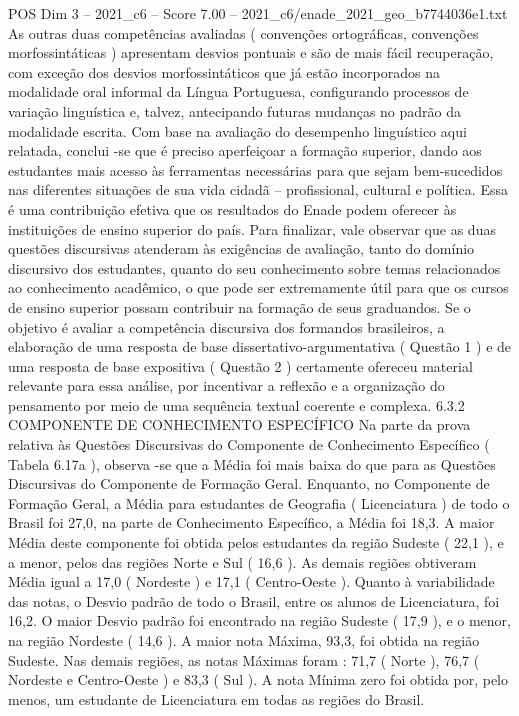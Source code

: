 \begin{textsample}{POS Dim 3 – 2021\_c6 – Score 7.00 – 2021\_c6/enade\_2021\_geo\_b7744036e1.txt}
As outras duas competências avaliadas ( convenções ortográficas, convenções morfossintáticas ) apresentam desvios pontuais e são de mais fácil recuperação, com exceção dos desvios morfossintáticos que já estão incorporados na modalidade oral informal da Língua Portuguesa, configurando processos de variação linguística e, talvez, antecipando futuras mudanças no padrão da modalidade escrita.
Com base na avaliação do desempenho linguístico aqui relatada, conclui -se que é preciso aperfeiçoar a formação superior, dando aos estudantes mais acesso às ferramentas necessárias para que sejam bem-sucedidos nas diferentes situações de sua vida cidadã – profissional, cultural e política.
Essa é uma contribuição efetiva que os resultados do Enade podem oferecer às instituições de ensino superior do país.
Para finalizar, vale observar que as duas questões discursivas atenderam às exigências de avaliação, tanto do domínio discursivo dos estudantes, quanto do seu conhecimento sobre temas relacionados ao conhecimento acadêmico, o que pode ser extremamente útil para que os cursos de ensino superior possam contribuir na formação de seus graduandos.
Se o objetivo é avaliar a competência discursiva dos formandos brasileiros, a elaboração de uma resposta de base dissertativo-argumentativa ( Questão 1 ) e de uma resposta de base expositiva ( Questão 2 ) certamente ofereceu material relevante para essa análise, por incentivar a reflexão e a organização do pensamento por meio de uma sequência textual coerente e complexa. 6.3.2 COMPONENTE DE CONHECIMENTO ESPECÍFICO Na parte da prova relativa às Questões Discursivas do Componente de Conhecimento Específico ( Tabela 6.17a ), observa -se que a Média foi mais baixa do que para as Questões Discursivas do Componente de Formação Geral.
Enquanto, no Componente de Formação Geral, a Média para estudantes de Geografia ( Licenciatura ) de todo o Brasil foi 27,0, na parte de Conhecimento Específico, a Média foi 18,3.
A maior Média deste componente foi obtida pelos estudantes da região Sudeste ( 22,1 ), e a menor, pelos das regiões Norte e Sul ( 16,6 ).
As demais regiões obtiveram Média igual a 17,0 ( Nordeste ) e 17,1 ( Centro-Oeste ).
Quanto à variabilidade das notas, o Desvio padrão de todo o Brasil, entre os alunos de Licenciatura, foi 16,2.
O maior Desvio padrão foi encontrado na região Sudeste ( 17,9 ), e o menor, na região Nordeste ( 14,6 ).
A maior nota Máxima, 93,3, foi obtida na região Sudeste.
Nas demais regiões, as notas Máximas foram : 71,7 ( Norte ), 76,7 ( Nordeste e Centro-Oeste ) e 83,3 ( Sul ).
A nota Mínima zero foi obtida por, pelo menos, um estudante de Licenciatura em todas as regiões do Brasil.

\end{textsample}
